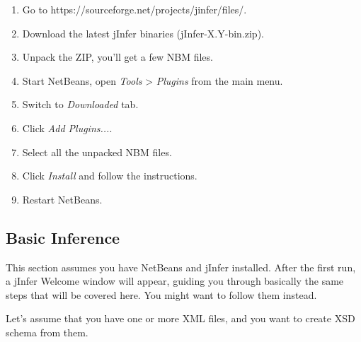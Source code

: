 \documentclass[a4paper,10pt,oneside]{article}
\begin{document}
\begin{enumerate}
  \item Go to https://sourceforge.net/projects/jinfer/files/.
  \item Download the latest jInfer binaries (jInfer-X.Y-bin.zip).
  \item Unpack the ZIP, you'll get a few NBM files.
  \item Start NetBeans, open \textit{Tools} > \textit{Plugins} from the main menu.
  \item Switch to \textit{Downloaded} tab.
  \item Click \textit{Add Plugins...}.
  \item Select all the unpacked NBM files.
  \item Click \textit{Install} and follow the instructions.
  \item Restart NetBeans.
  \end{enumerate}
\subsection*{Basic Inference}
\par 
  This section assumes you have NetBeans and jInfer installed. After the first run, a jInfer Welcome window will appear, guiding you through basically the same steps that will be covered here. You might want to follow them instead.

\par 
  Let's assume that you have one or more XML files, and you want to create XSD schema from them.
\end{document}
